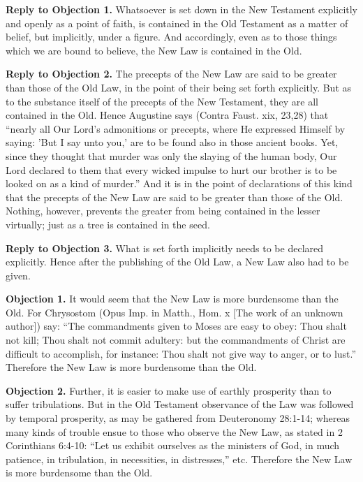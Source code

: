 \textbf{Reply to Objection 1.} Whatsoever is set down in the New Testament explicitly and openly as a point of faith, is contained in the Old Testament as a matter of belief, but implicitly, under a figure. And accordingly, even as to those things which we are bound to believe, the New Law is contained in the Old.

\textbf{Reply to Objection 2.} The precepts of the New Law are said to be greater than those of the Old Law, in the point of their being set forth explicitly. But as to the substance itself of the precepts of the New Testament, they are all contained in the Old. Hence Augustine says (Contra Faust. xix, 23,28) that ``nearly all Our Lord's admonitions or precepts, where He expressed Himself by saying: 'But I say unto you,' are to be found also in those ancient books. Yet, since they thought that murder was only the slaying of the human body, Our Lord declared to them that every wicked impulse to hurt our brother is to be looked on as a kind of murder.'' And it is in the point of declarations of this kind that the precepts of the New Law are said to be greater than those of the Old. Nothing, however, prevents the greater from being contained in the lesser virtually; just as a tree is contained in the seed.

\textbf{Reply to Objection 3.} What is set forth implicitly needs to be declared explicitly. Hence after the publishing of the Old Law, a New Law also had to be given.


\textbf{Objection 1.} It would seem that the New Law is more burdensome than the Old. For Chrysostom (Opus Imp. in Matth., Hom. x [The work of an unknown author]) say: ``The commandments given to Moses are easy to obey: Thou shalt not kill; Thou shalt not commit adultery: but the commandments of Christ are difficult to accomplish, for instance: Thou shalt not give way to anger, or to lust.'' Therefore the New Law is more burdensome than the Old.

\textbf{Objection 2.} Further, it is easier to make use of earthly prosperity than to suffer tribulations. But in the Old Testament observance of the Law was followed by temporal prosperity, as may be gathered from Deuteronomy 28:1-14; whereas many kinds of trouble ensue to those who observe the New Law, as stated in 2 Corinthians 6:4-10: ``Let us exhibit ourselves as the ministers of God, in much patience, in tribulation, in necessities, in distresses,'' etc. Therefore the New Law is more burdensome than the Old.

